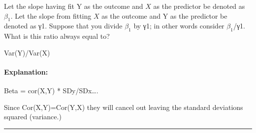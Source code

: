 \documentclass[
]{article}
\begin{document}
Let the slope having fit Y as the outcome and \(X\) as the predictor be
denoted as \(\beta_1\). Let the slope from fitting \(X\) as the outcome
and Y as the predictor be denoted as γ1. Suppose that you divide
\(\beta_1\) by γ1; in other words consider \(\beta_1\)/γ1. What is this
ratio always equal to?

Var(Y)/Var(X)

\hypertarget{explanation-9}{%
\paragraph{Explanation:}\label{explanation-9}}

Beta = cor(X,Y) * SDy/SDx\ldots.

Since Cor(X,Y)=Cor(Y,X) they will cancel out leaving the standard
deviations squared (variance.)

\begin{center}\rule{0.5\linewidth}{0.5pt}\end{center}
\end{document}
